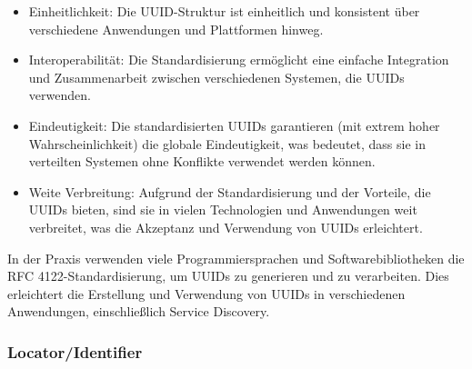 \documentclass[../vs-script-first-v01.tex]{subfiles}
\begin{document}
\begin{itemize}
\item Einheitlichkeit: Die UUID-Struktur ist einheitlich und konsistent über verschiedene Anwendungen und Plattformen hinweg.
\item Interoperabilität: Die Standardisierung ermöglicht eine einfache Integration und Zusammenarbeit zwischen verschiedenen Systemen, die UUIDs verwenden.
\item Eindeutigkeit: Die standardisierten UUIDs garantieren (mit extrem hoher Wahrscheinlichkeit) die globale Eindeutigkeit, was bedeutet, dass sie in verteilten Systemen ohne Konflikte verwendet werden können.
\item Weite Verbreitung: Aufgrund der Standardisierung und der Vorteile, die UUIDs bieten, sind sie in vielen Technologien und Anwendungen weit verbreitet, was die Akzeptanz und Verwendung von UUIDs erleichtert.
\end{itemize}
In der Praxis verwenden viele Programmiersprachen und Softwarebibliotheken die RFC 4122-Standardisierung, um UUIDs zu generieren und zu verarbeiten. Dies erleichtert die Erstellung und Verwendung von UUIDs in verschiedenen Anwendungen, einschließlich Service Discovery.


\subsubsection{Locator/Identifier}
\end{document}
